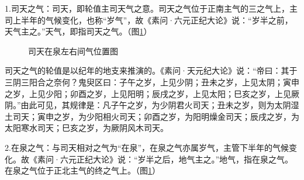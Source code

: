 \documentclass[12pt]{ctexbook}
\begin{document}
1.司天之气：司天，即轮值主司天气之意。司天之气位于正南主气的三之气上，主司上半年的气候变化，也称“岁气”，故《素问·六元正纪大论》说：“岁半之前，天气主之。”天气，即指司天之气。（图\ref{fig:司天在泉左右间气位置图}）
\begin{figure}[htb]%
	\centering
	\caption{司天在泉左右间气位置图}\label{fig:司天在泉左右间气位置图}
\end{figure}

司天之气的轮值是以纪年的地支来推演的。《素问·天元纪大论》说：“帝曰：其于三阴三阳合之奈何？鬼臾区曰：子午之岁，上见少阴；丑未之岁，上见太阴；寅申之岁，上见少阳；卯酉之岁，上见阳明；辰戌之岁，上见太阳；巳亥之岁，上见厥阴。”由此可见，其规律是：凡子午之岁，为少阴君火司天；丑未之岁，则为太阴湿土司天；寅申之岁，为少阳相火司天；卯酉之岁，为阳明燥金司天；辰戌之岁，为太阳寒水司天；巳亥之岁，为厥阴风木司天。

2.在泉之气：与司天相对之气为“在泉”，在泉之气亦属岁气，主管下半年的气候变化。故《素问·六元正纪大论》说：“岁半之后，地气主之。”地气，指在泉之气。在泉之气位于正北主气的终之气上。（图\ref{fig:司天在泉左右间气位置图}）
\end{document}
